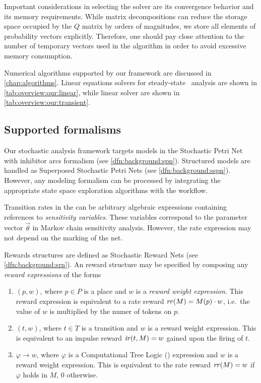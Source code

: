 \begin{itemize}
  Important considerations in selecting the solver are its convergence
  behavior and its memory requirements. While matrix decompositions
  can reduce the storage space occupied by the $Q$ matrix by orders of
  magnitudes, we store all elements of probability vectors
  explicitly. Therefore, one should pay close attention to the number
  of temporary vectors used in the algorithm in order to avoid
  excessive memory consumption.

  Numerical algorithms supported by our framework are discussed in
  \cref{chap:algorithms}. Linear equations solvers for steady-state
  \CTMC\ analysis are shown in \cref{tab:overview:our:linear}, while
  linear solver are shown in \cref{tab:overview:our:transient}.
\end{itemize}

\subsection{Supported formalisms}

Our stochastic analysis framework targets models in the Stochastic
Petri Net with inhibitor arcs formalism (see
\vref{dfn:background:spn}). Structured models are handled as
Superposed Stochastic Petri Nets (see
\vref{dfn:background:sspn}). However, any modeling formalism can be
processed by integrating the appropriate state space exploration
algorithms with the workflow.

Transition rates in the  can be arbitrary algebraic
expressions containing references to \emph{sensitivity
  variables}. These variables correspond to the parameter vector
$\vec{\theta}$ in Markov chain sensitivity analysis. However, the rate
expression may not depend on the marking of the net.

Rewards structures are defined as Stochastic Reward Nets (see
\vref{dfn:background:srn}). An  reward structure may be
specified by composing any \emph{reward expressions} of the forms
\begin{enumerate}
\item $(p, w)$, where $p \in P$ is a place and $w$ is a \emph{reward
    weight expression}. This reward expression is equivalent to
  a rate reward $\mathit{rr}(M) = M(p) \cdot w$, i.e.~the value of $w$
  is multiplied by the numer of tokens on $p$.
\item $(t, w)$, where $t \in T$ is a transition and $w$ is a reward
  weight expression. This is equivalent to an impulse reward
  $\mathit{ir}(t, M) = w$ gained upon the firing of $t$.
\item $\varphi \rightarrow w$, where $\varphi$ is a Computational Tree
  Logic () expression and $w$ is a reward weight
  expression. This is equivalent to the rate reward $\mathit{rr}(M) =
  w$ if $\varphi$ holds in $M$, $0$ otherwise.
\end{enumerate}

